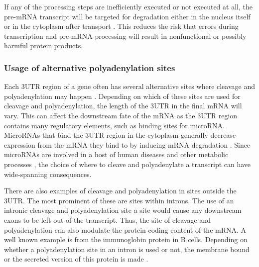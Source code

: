 If any of the processing steps are inefficiently executed or not executed at
all, the pre-mRNA transcript will be targeted for degradation either in the
nucleus itself or in the cytoplasm after transport \cite{doma_rna_2007}. This
reduces the risk that errors during transcription and pre-mRNA processing will
result in nonfunctional or possibly harmful protein products.

\subsubsection{Usage of alternative polyadenylation sites}
Each 3\p UTR region of a gene often has several alternative sites where
cleavage and polyadenylation may happen \cite{tian_large-scale_2005}. Depending
on which of these sites are used for cleavage and polyadenylation, the length
of the 3\p UTR in the final mRNA will vary. This can affect the downstream fate
of the mRNA as the 3\p UTR region contains many regulatory elements, such as
binding sites for microRNA. MicroRNAs that bind the 3\p UTR region in the
cytoplasm generally decrease expression from the mRNA they bind to by inducing
mRNA degradation \cite{huntzinger_gene_2011}. Since microRNAs are involved in a
host of human diseases and other metabolic processes
\cite{huang_biological_2010}, the choice of where to cleave and polyadenylate a
transcript can have wide-spanning consequences.

There are also examples of cleavage and polyadenylation in sites outside the
3\p UTR. The most prominent of these are sites within introns. The use of an
intronic cleavage and polyadenylation site a site would cause any downstream
exons to be left out of the transcript. Thus, the site of cleavage and
polyadenylation can also modulate the protein coding content of the mRNA. A
well known example is from the immunoglobin protein in B cells. Depending on
whether a polyadenylation site in an intron is used or not, the membrane bound
or the secreted version of this protein is made \cite{peterson_regulated_1989}.

